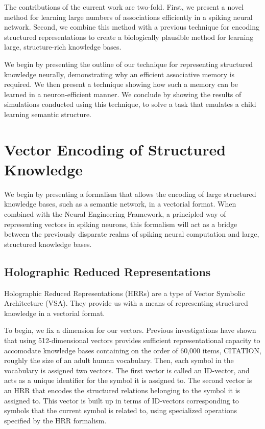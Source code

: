 \documentclass[10pt,letterpaper]{article}
\begin{document}
The contributions of the current work are two-fold. First, we present a novel method for learning large numbers of associations efficiently in a spiking neural network. Second, we combine this method with a previous technique for encoding structured representations to create a biologically plausible method for learning large, structure-rich knowledge bases.

We begin by presenting the outline of our technique for representing structured knowledge neurally, demonstrating why an efficient associative memory is required. We then present a technique showing how such a memory can be learned in a neuron-efficient manner. We conclude by showing the results of simulations conducted using this technique, to solve a task that emulates a child learning semantic structure.

\section{Vector Encoding of Structured Knowledge}
We begin by presenting a formalism that allows the encoding of large structured knowledge bases, such as a semantic network, in a vectorial format. When combined with the Neural Engineering Framework, a principled way of representing vectors in spiking neurons, this formalism will act as a bridge between the previously disparate realms of spiking neural computation and large, structured knowledge bases.

\subsection{Holographic Reduced Representations}
Holographic Reduced Representations (HRRs) are a type of Vector Symbolic Architecture (VSA). They provide us with a means of representing structured knowledge in a vectorial format. 

To begin, we fix a dimension for our vectors. Previous investigations have shown that using 512-dimensional vectors provides sufficient representational capacity to accomodate knowledge bases containing on the order of 60,000 items,  CITATION, roughly the size of an adult human vocabulary. Then, each symbol in the vocabulary is assigned two vectors. The first vector is called an ID-vector, and acts as a unique identifier for the symbol it is assigned to. The second vector is an HRR that encodes the structured relations belonging to the symbol it is assigned to. This vector is built up in terms of ID-vectors corresponding to symbols that the current symbol is related to, using specialized operations specified by the HRR formalism.
\end{document}
